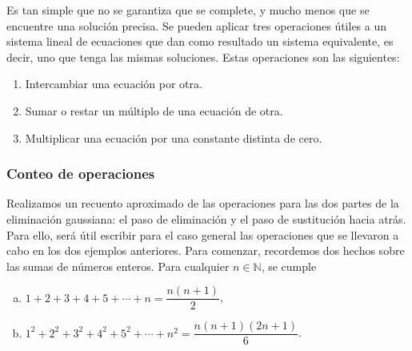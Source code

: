 Es tan simple que no se garantiza que se complete, y mucho menos que
se encuentre una solución precisa.
Se pueden aplicar tres operaciones útiles a un sistema lineal de
ecuaciones que dan como resultado un sistema equivalente, es decir,
uno que tenga las mismas soluciones.
Estas operaciones son las siguientes:

\begin{enumerate}
    \item

          Intercambiar una ecuación por otra.

    \item

          Sumar o restar un múltiplo de una ecuación de otra.

    \item

          Multiplicar una ecuación por una constante distinta de
          cero.
\end{enumerate}

\subsubsection{Conteo de operaciones}

Realizamos un recuento aproximado de las operaciones para las dos
partes de la eliminación gaussiana:
el paso de eliminación y el paso de sustitución hacia atrás.
Para ello, será útil escribir para el caso general las operaciones
que se llevaron a cabo en los dos ejemplos anteriores.
Para comenzar, recordemos dos hechos sobre las sumas de números
enteros.
Para cualquier $n\in\mathbb{N}$, se cumple

\begin{multicols}{2}
    \begin{enumerate}[a)]
        \item
              \begin{math}
                  1+2+3+4+5+\cdots+n=
                  \dfrac{n\left(n+1\right)}{2}
              \end{math},

        \item
              \begin{math}
                  1^{2}+2^{2}+3^{2}+4^{2}+5^{2}+\cdots+n^{2}=
                  \dfrac{n\left(n+1\right)\left(2n+1\right)}{6}
              \end{math}.
    \end{enumerate}
\end{multicols}

